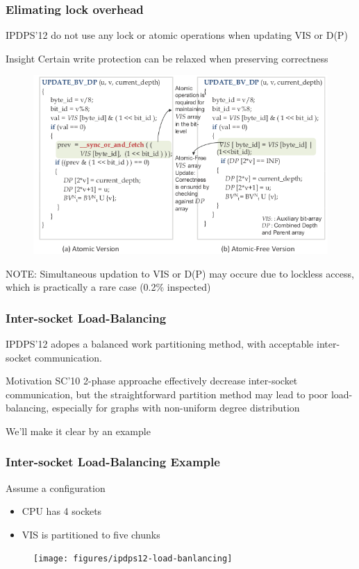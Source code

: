 \documentclass[]{beamer}
\begin{document}
\begin{frame}
  \frametitle{Elimating lock overhead}
  IPDPS'12 do not use any lock or atomic operations when updating VIS or D(P)
  \begin{block}{Insight}
    Certain write protection can be relaxed when preserving correctness
  \end{block}
  \begin{figure}
    \centering
    \includegraphics[width=.6\textwidth]{figures/ipdps12-atomic-free}
  \end{figure}
  NOTE: Simultaneous updation to VIS or D(P) may occure due to lockless access, which
  is practically a rare case (0.2\% inspected)
\end{frame}

\begin{frame}
  \frametitle{Inter-socket Load-Balancing}
  IPDPS'12 adopes a balanced work partitioning method, with acceptable inter-socket communication.
  \begin{block}{Motivation}
  SC'10 2-phase approache effectively decrease inter-socket communication, but the straightforward
  partition method may lead to poor load-balancing, especially for graphs with non-uniform degree
  distribution
  \end{block}
  We'll make it clear by an example
\end{frame}

\begin{frame}
  \frametitle{Inter-socket Load-Balancing Example}
  Assume a configuration
  \begin{itemize}
    \item CPU has 4 sockets
    \item VIS is partitioned to five chunks
  \end{itemize}
  \begin{figure}
    \centering
    \texttt{[image: figures/ipdps12-load-banlancing]}
  \end{figure}
\end{frame}
\end{document}
